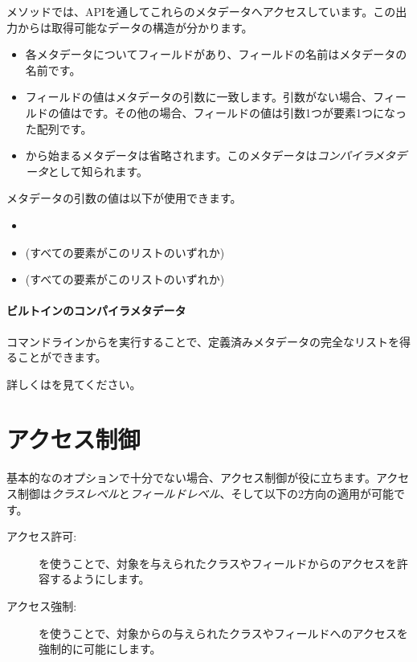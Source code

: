 メソッドでは、APIを通してこれらのメタデータへアクセスしています。この出力からは取得可能なデータの構造が分かります。

\begin{itemize}
	\item 各メタデータについてフィールドがあり、フィールドの名前はメタデータの名前です。
	\item フィールドの値はメタデータの引数に一致します。引数がない場合、フィールドの値はです。その他の場合、フィールドの値は引数1つが要素1つになった配列です。
	\item \expr{:}から始まるメタデータは省略されます。このメタデータは\emph{コンパイラメタデータ}として知られます。
\end{itemize}

メタデータの引数の値は以下が使用できます。

\begin{itemize}
	\item {}
	\item {} (すべての要素がこのリストのいずれか)
	\item {} (すべての要素がこのリストのいずれか)
\end{itemize}

\paragraph{ビルトインのコンパイラメタデータ}
コマンドラインからを実行することで、定義済みメタデータの完全なリストを得ることができます。

詳しくはを見てください。

\section{アクセス制御}
\label{lf-access-control}

基本的なのオプションで十分でない場合、アクセス制御が役に立ちます。アクセス制御は\emph{クラスレベル}と\emph{フィールドレベル}、そして以下の2方向の適用が可能です。

\begin{description}
	\item[アクセス許可:] を使うことで、対象を与えられたクラスやフィールドからのアクセスを許容するようにします。
	\item[アクセス強制:] を使うことで、対象からの与えられたクラスやフィールドへのアクセスを強制的に可能にします。
\end{description}

